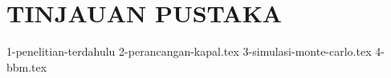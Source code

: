 \chapter{TINJAUAN PUSTAKA}
\label{chap:tinjauanpustaka}

{1-penelitian-terdahulu}
{2-perancangan-kapal.tex}
{3-simulasi-monte-carlo.tex}
{4-bbm.tex}
